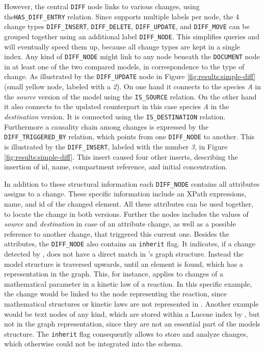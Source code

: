 However, the central \texttt{DIFF} node links to various changes, using the\linebreak \texttt{HAS\_DIFF\_ENTRY} relation. Since \neoj supports multiple labels per node, the 4 change types \texttt{DIFF\_INSERT}, \texttt{DIFF\_DELETE}, \texttt{DIFF\_UPDATE}, and \texttt{DIFF\_MOVE} can be grouped together using an additional label \texttt{DIFF\_NODE}. This simplifies queries and will eventually speed them up, because all change types are kept in a single index.
Any kind of \texttt{DIFF\_NODE} might link to any node beneath the \texttt{DOCUMENT} node in at least one of the two compared models, in correspondence to the type of change.
As illustrated by the \texttt{DIFF\_UPDATE} node in Figure \ref{fig:results:simple-diff} (small yellow node, labeled with a \emph{2}). On one hand it connects to the species \emph{A} in the \emph{source} version of the model using the \texttt{IS\_SOURCE} relation. On the other hand it also connects to the updated counterpart in this case species \emph{A} in the \emph{destination} version. It is connected using the \texttt{IS\_DESTINATION} relation.
Furthermore a causality chain among changes is expressed by the \texttt{DIFF\_TRIGGERED\_BY} relation, which points from one \texttt{DIFF\_NODE} to another. This is illustrated by the \texttt{DIFF\_INSERT}, labeled with the number \emph{3}, in Figure \ref{fig:results:simple-diff}. This insert caused four other inserts, describing the insertion of id, name, compartment reference, and initial concentration.

In addition to these structural information each \texttt{DIFF\_NODE} contains all attributes \bives assigns to a change. These \bives specific information include an XPath expressions, name, and id of the changed \xml element. All these attributes can be used together, to locate the change in both versions.
Further the nodes includes the values of \emph{source} and \emph{destination} in case of an attribute change, as well as a possible reference to another change, that triggered this current one.
Besides the \bives attributes, the \texttt{DIFF\_NODE} also contains an \texttt{inherit} flag. It indicates, if a change detected by \bives, does not have a direct match in \masymos's graph structure. Instead the model structure is traversed upwards, until an element is found, which has a representation in the \masymos graph.
This, for instance, applies to changes of a mathematical parameter in a kinetic law of a reaction. In this specific example, the change would be linked to the node representing the reaction, since mathematical structures or kinetic laws are not represented in \masymos. Another example would be text nodes of any kind, which are stored within a Lucene index by \masymos, but not in the graph representation, since they are not an essential part of the models structure.
The \texttt{inherit} flag consequently allows to store and analyze changes, which otherwise could not be integrated into the schema.

